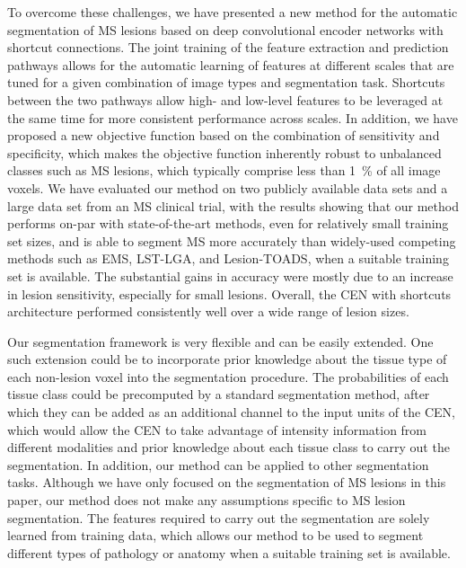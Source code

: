 To overcome these challenges, we have presented a new method for the automatic
segmentation of MS lesions based on deep convolutional encoder networks with
shortcut connections. The joint training of the feature extraction and
prediction pathways allows for the automatic learning of features at different
scales that are tuned for a given combination of image types and segmentation
task. Shortcuts between the two pathways allow high- and low-level features to
be leveraged at the same time for more consistent performance across scales. In
addition, we have proposed a new objective function based on the combination of
sensitivity and specificity, which makes the objective function inherently
robust to unbalanced classes such as MS lesions, which typically comprise less
than \SI{1}{\percent} of all image voxels.
%
We have evaluated our method on two publicly available data sets and a large
data set from an MS clinical trial, with the results showing that our method
performs on-par with state-of-the-art methods, even for relatively small
training set sizes, and is able to segment MS more accurately than widely-used
competing methods such as EMS, LST-LGA, and Lesion-TOADS, when a suitable
training set is available. The substantial gains in accuracy were mostly due to
an increase in lesion sensitivity, especially for small lesions. Overall, the
CEN with shortcuts architecture performed consistently well over a wide range of
lesion sizes.

Our segmentation framework is very flexible and can be easily extended. One such
extension could be to incorporate prior knowledge about the tissue type of each
non-lesion voxel into the segmentation procedure. The probabilities of each
tissue class could be precomputed by a standard segmentation method, after which
they can be added as an additional channel to the input units of the CEN, which
would allow the CEN to take advantage of intensity information from different
modalities and prior knowledge about each tissue class to carry out the
segmentation. In addition, our method can be applied to other segmentation
tasks. Although we have only focused on the segmentation of MS lesions in this
paper, our method does not make any assumptions specific to MS lesion
segmentation. The features required to carry out the segmentation are solely
learned from training data, which allows our method to be used to segment
different types of pathology or anatomy when a suitable training set is
available.


